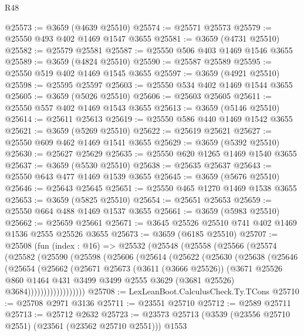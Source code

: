 \begin{lexlean}{R48}
\begin{coremodule}
@25573 := @3659 (@4639 @25510)
@25574 := @25571 @25573
@25579 := @25550 @493 @402 @1469 @1547 @3655
@25581 := @3659 (@4731 @25510)
@25582 := @25579 @25581
@25587 := @25550 @506 @403 @1469 @1546 @3655
@25589 := @3659 (@4824 @25510)
@25590 := @25587 @25589
@25595 := @25550 @519 @402 @1469 @1545 @3655
@25597 := @3659 (@4921 @25510)
@25598 := @25595 @25597
@25603 := @25550 @534 @402 @1469 @1544 @3655
@25605 := @3659 (@5026 @25510)
@25606 := @25603 @25605
@25611 := @25550 @557 @402 @1469 @1543 @3655
@25613 := @3659 (@5146 @25510)
@25614 := @25611 @25613
@25619 := @25550 @586 @440 @1469 @1542 @3655
@25621 := @3659 (@5269 @25510)
@25622 := @25619 @25621
@25627 := @25550 @609 @462 @1469 @1541 @3655
@25629 := @3659 (@5392 @25510)
@25630 := @25627 @25629
@25635 := @25550 @620 @1265 @1469 @1540 @3655
@25637 := @3659 (@5530 @25510)
@25638 := @25635 @25637
@25643 := @25550 @643 @477 @1469 @1539 @3655
@25645 := @3659 (@5676 @25510)
@25646 := @25643 @25645
@25651 := @25550 @465 @1270 @1469 @1538 @3655
@25653 := @3659 (@5825 @25510)
@25654 := @25651 @25653
@25659 := @25550 @664 @488 @1469 @1537 @3655
@25661 := @3659 (@5983 @25510)
@25662 := @25659 @25661
@25671 := @3645 @25526 @25510 @741 @402 @1469 @1536 @2555 @25526 @3655
@25673 := @3659 (@6185 @25510)
@25707 := @25508
    (fun (index : @16) =>
    @25532
      (@25548
        (@25558
          (@25566
            (@25574
              (@25582
                (@25590
                  (@25598
                    (@25606
                      (@25614
                        (@25622
                          (@25630
                            (@25638
                              (@25646
                                (@25654
                                  (@25662
                                    (@25671
                                      @25673
                                      (@3611 (@3666 @25526))
                                      (@3671
                                        @25526
                                        @860
                                        @1464
                                        @431
                                        @3499
                                        @3499
                                        @2555
                                        @3629
                                        (@3681 @25526)
                                        @3684))))))))))))))))))
@25708 := LexLeanBoot.CalculusCheck.Ty.TCons
@25710 := @25708 @2971 @3136
@25711 := @23551 @25710
@25712 := @2589 @25711
@25713 := @25712 @2632
@25723 := @23573 @25713 (@3539 (@23556 @25710 @2551) (@23561 (@23562 @25710 @2551))) @1553

\end{coremodule}
\end{lexlean}
